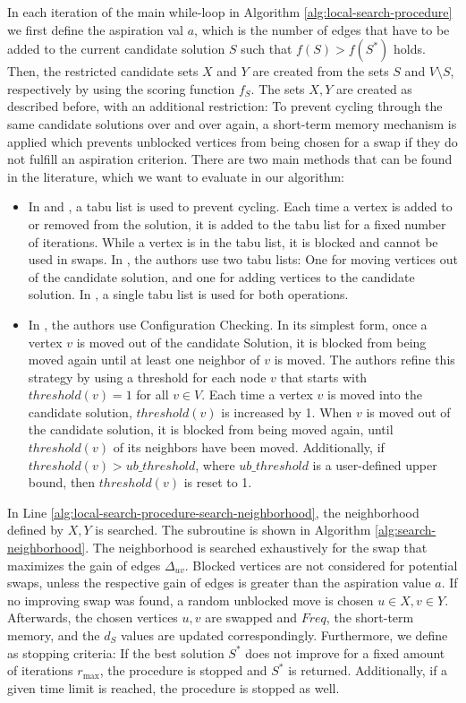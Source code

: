 \documentclass[draft,final]{vutinfth} %
\begin{document}
In each iteration of the main while-loop in Algorithm \ref{alg:local-search-procedure} we first define the aspiration val $a$, which is the number of edges that have to be added to the current candidate solution $S$ such that $f(S) > f(S^*)$ holds. 
Then, the restricted candidate sets $X$ and $Y$ are created from the sets $S$ and $V \setminus S$, respectively by using the scoring function $f_S$. 
The sets $X, Y$ are created as described before, with an additional restriction: To prevent cycling through the same candidate solutions over and over again, a short-term memory mechanism is applied which prevents unblocked vertices from being chosen for a swap if they do not fulfill an aspiration criterion. 
There are two main methods that can be found in the literature, which we want to evaluate in our algorithm: 
\begin{itemize}
    \item In \cite{djeddi_extension_2019} and \cite{zhou_opposition-based_2020}, a tabu list is used to prevent cycling. Each time a vertex is added to or removed from the solution, it is added to the tabu list for a fixed number of iterations. While a vertex is in the tabu list, it is blocked and cannot be used in swaps. In \cite{djeddi_extension_2019}, the authors use two tabu lists: One for moving vertices out of the candidate solution, and one for adding vertices to the candidate solution. In \cite{zhou_opposition-based_2020}, a single tabu list is used for both operations. 
    \item In \cite{chen_nuqclq_2021}, the authors use Configuration Checking. In its simplest form, once a vertex $v$ is moved out of the candidate Solution, it is blocked from being moved again until at least one neighbor of $v$ is moved. The authors refine this strategy by using a threshold for each node $v$ that starts with $\mathit{threshold}(v) = 1$ for all $v \in V$. Each time a vertex $v$ is moved into the candidate solution, $\mathit{threshold}(v)$ is increased by 1. When $v$ is moved out of the candidate solution, it is blocked from being moved again, until $\mathit{threshold}(v)$ of its neighbors have been moved. Additionally, if $\mathit{threshold}(v) > \mathit{ub\_threshold}$, where $\mathit{ub\_threshold}$ is a user-defined upper bound, then $\mathit{threshold}(v)$ is reset to 1. 
\end{itemize}
In Line \ref{alg:local-search-procedure-search-neighborhood}, the neighborhood defined by $X, Y$ is searched. The subroutine is shown in Algorithm \ref{alg:search-neighborhood}. The neighborhood is searched exhaustively for the swap that maximizes the gain of edges $\Delta_{uv}$. Blocked vertices are not considered for potential swaps, unless the respective gain of edges is greater than the aspiration value $a$. 
If no improving swap was found, a random unblocked move is chosen $u \in X, v \in Y$. 
Afterwards, the chosen vertices $u ,v$ are swapped and $\mathit{Freq}$, the short-term memory, and the $d_S$ values are updated correspondingly. 
Furthermore, we define as stopping criteria: If the best solution $S^*$ does not improve for a fixed amount of iterations $r_{\max}$, the procedure is stopped and $S^*$ is returned. Additionally, if a given time limit is reached, the procedure is stopped as well. 
\end{document}
